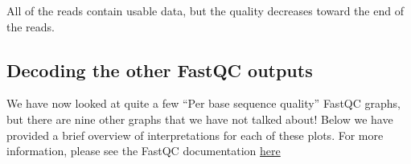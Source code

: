 \documentclass[
  letterpaper,
  DIV=11,
  numbers=noendperiod]{scrreprt}
\begin{document}
\begin{tcolorbox}[enhanced jigsaw, toptitle=1mm, breakable, bottomrule=.15mm, colback=white, toprule=.15mm, opacityback=0, bottomtitle=1mm, coltitle=black, opacitybacktitle=0.6, rightrule=.15mm, colframe=quarto-callout-caution-color-frame, titlerule=0mm, colbacktitle=quarto-callout-caution-color!10!white, title={Solution}, left=2mm, leftrule=.75mm, arc=.35mm]

All of the reads contain usable data, but the quality decreases toward
the end of the reads.

\end{tcolorbox}

\hypertarget{decoding-the-other-fastqc-outputs}{%
\subsection{\texorpdfstring{\textbf{Decoding the other FastQC
outputs}}{Decoding the other FastQC outputs}}\label{decoding-the-other-fastqc-outputs}}

We have now looked at quite a few ``Per base sequence quality'' FastQC
graphs, but there are nine other graphs that we have not talked about!
Below we have provided a brief overview of interpretations for each of
these plots. For more information, please see the FastQC documentation
\href{https://www.bioinformatics.babraham.ac.uk/projects/fastqc/Help/}{here}
\end{document}
